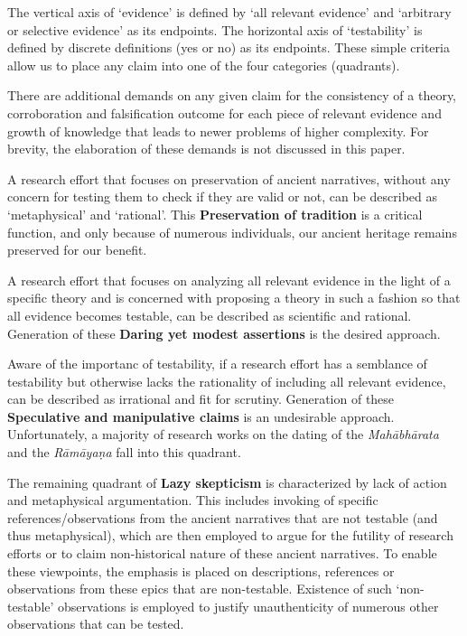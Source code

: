 The vertical axis of ‘evidence’ is defined by ‘all relevant evidence’ and ‘arbitrary or selective evidence’ as its endpoints. The horizontal axis of ‘testability’ is defined by discrete definitions (yes or no) as its endpoints. These simple criteria allow us to place any claim into one of the four categories (quadrants).

There are additional demands on any given claim for the consistency of a theory, corroboration and falsification outcome for each piece of relevant evidence and growth of knowledge that leads to newer problems of higher complexity. For brevity, the elaboration of these demands is not discussed in this paper.

\newpage

A research effort that focuses on preservation of ancient narratives, without any concern for testing them to check if they are valid or not, can be described as ‘metaphysical’ and ‘rational’. This \textbf{Preservation of tradition} is a critical function, and only because of numerous individuals, our ancient heritage remains preserved for our benefit.

A research effort that focuses on analyzing all relevant evidence in the light of a specific theory and is concerned with proposing a theory in such a fashion so that all evidence becomes testable, can be described as scientific and rational. Generation of these \textbf{Daring yet modest assertions} is the desired approach.

Aware of the importanc of testability, if a research effort has a semblance of testability but otherwise lacks the rationality of including all relevant evidence, can be described as irrational and fit for scrutiny. Generation of these \textbf{Speculative and manipulative claims} is an undesirable approach. Unfortunately, a majority of research works on the dating of the \textit{Mahābhārata} and the \textit{Rāmāyaṇa} fall into this quadrant.

The remaining quadrant of \textbf{Lazy skepticism} is characterized by lack of action and metaphysical argumentation. This includes invoking of specific references/observations from the ancient narratives that are not testable (and thus metaphysical), which are then employed to argue for the futility of research efforts or to claim non-historical nature of these ancient narratives. To enable these viewpoints, the emphasis is placed on descriptions, references or observations from these epics that are non-testable. Existence of such ‘non-testable’ observations is employed to justify unauthenticity of numerous other observations that can be tested.

